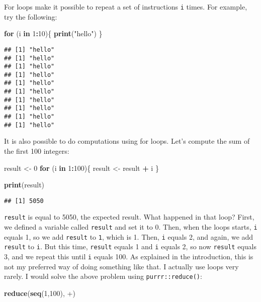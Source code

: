 \documentclass[
]{article}
\newenvironment{Shaded}{\begin{snugshade}}{\end{snugshade}}
\newcommand{\ControlFlowTok}[1]{\textcolor[rgb]{0.13,0.29,0.53}{\textbf{#1}}}
\newcommand{\DataTypeTok}[1]{\textcolor[rgb]{0.13,0.29,0.53}{#1}}
\newcommand{\DecValTok}[1]{\textcolor[rgb]{0.00,0.00,0.81}{#1}}
\newcommand{\KeywordTok}[1]{\textcolor[rgb]{0.13,0.29,0.53}{\textbf{#1}}}
\newcommand{\NormalTok}[1]{#1}
\newcommand{\OperatorTok}[1]{\textcolor[rgb]{0.81,0.36,0.00}{\textbf{#1}}}
\newcommand{\StringTok}[1]{\textcolor[rgb]{0.31,0.60,0.02}{#1}}
\begin{document}
For loops make it possible to repeat a set of instructions \texttt{i} times. For example, try the following:

\begin{Shaded}
\begin{Highlighting}[]
\ControlFlowTok{for}\NormalTok{ (i }\ControlFlowTok{in} \DecValTok{1}\OperatorTok{:}\DecValTok{10}\NormalTok{)\{}
  \KeywordTok{print}\NormalTok{(}\StringTok{"hello"}\NormalTok{)}
\NormalTok{\}}
\end{Highlighting}
\end{Shaded}

\begin{verbatim}
## [1] "hello"
## [1] "hello"
## [1] "hello"
## [1] "hello"
## [1] "hello"
## [1] "hello"
## [1] "hello"
## [1] "hello"
## [1] "hello"
## [1] "hello"
\end{verbatim}

It is also possible to do computations using for loops. Let's compute the sum of the first
100 integers:

\begin{Shaded}
\begin{Highlighting}[]
\NormalTok{result \textless{}{-}}\StringTok{ }\DecValTok{0}
\ControlFlowTok{for}\NormalTok{ (i }\ControlFlowTok{in} \DecValTok{1}\OperatorTok{:}\DecValTok{100}\NormalTok{)\{}
\NormalTok{  result \textless{}{-}}\StringTok{ }\NormalTok{result }\OperatorTok{+}\StringTok{ }\NormalTok{i}
\NormalTok{\}}

\KeywordTok{print}\NormalTok{(result)}
\end{Highlighting}
\end{Shaded}

\begin{verbatim}
## [1] 5050
\end{verbatim}

\texttt{result} is equal to 5050, the expected result. What happened in that loop? First, we defined a
variable called \texttt{result} and set it to 0. Then, when the loops starts, \texttt{i} equals 1, so we add
\texttt{result} to \texttt{1}, which is 1. Then, \texttt{i} equals 2, and again, we add \texttt{result} to \texttt{i}. But this time,
\texttt{result} equals 1 and \texttt{i} equals 2, so now \texttt{result} equals 3, and we repeat this until \texttt{i}
equals 100. As explained in the introduction, this is not my preferred way of doing something like
that. I actually use loops very rarely. I would solve the above problem using \texttt{purrr::reduce()}:

\begin{Shaded}
\begin{Highlighting}[]
\KeywordTok{reduce}\NormalTok{(}\KeywordTok{seq}\NormalTok{(}\DecValTok{1}\NormalTok{,}\DecValTok{100}\NormalTok{), }\StringTok{\textasciigrave{}}\DataTypeTok{+}\StringTok{\textasciigrave{}}\NormalTok{)}
\end{Highlighting}
\end{Shaded}
\end{document}
